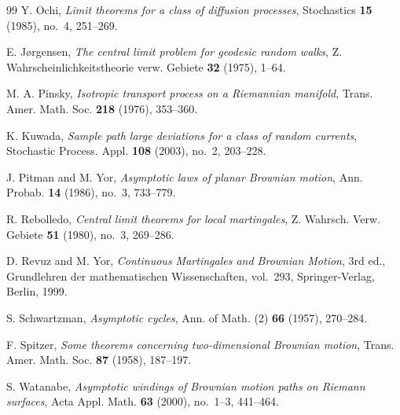 \documentclass[a4paper,reqno]{amsart}
\theoremstyle{definition}
\begin{document}
\begin{thebibliography}{99}
Y. Ochi,
\emph{Limit theorems for a class of diffusion processes},
Stochastics \textbf{15} (1985), no.~4, 251--269.

E. J{\o}rgensen,
\emph{The central limit problem for geodesic random walks},
Z. Wahrscheinlichkeitstheorie verw. Gebiete \textbf{32} (1975), 1--64.

M. A. Pinsky,
\emph{Isotropic transport process on a Riemannian manifold},
Trans. Amer. Math. Soc. \textbf{218} (1976), 353--360.

K. Kuwada,
\emph{Sample path large deviations for a class of random currents},
Stochastic Process. Appl. \textbf{108} (2003), no.~2, 203--228.

J. Pitman and M. Yor,
\emph{Asymptotic laws of planar Brownian motion},
Ann. Probab. \textbf{14} (1986), no.~3, 733--779.

R. Rebolledo,
\emph{Central limit theorems for local martingales},
Z. Wahrsch. Verw. Gebiete \textbf{51} (1980), no.~3, 269--286.

D. Revuz and M. Yor,
\emph{Continuous Martingales and Brownian Motion},
3rd ed., Grundlehren der mathematischen Wissenschaften, vol.~293,
Springer-Verlag, Berlin, 1999.

S. Schwartzman,
\emph{Asymptotic cycles},
Ann. of Math. (2) \textbf{66} (1957), 270--284.

F. Spitzer,
\emph{Some theorems concerning two-dimensional Brownian motion},
Trans. Amer. Math. Soc. \textbf{87} (1958), 187--197.

S. Watanabe,
\emph{Asymptotic windings of Brownian motion paths on Riemann surfaces},
Acta Appl. Math. \textbf{63} (2000), no.~1--3, 441--464.

\end{thebibliography}
\end{document}
